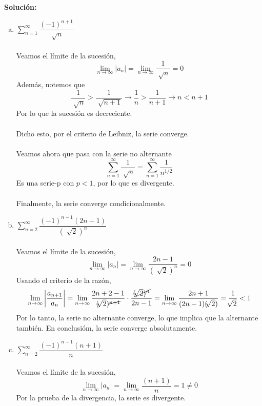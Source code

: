 \documentclass[12pt]{article}
\newenvironment{solucion}
{\begin{mdframed}[backgroundcolor=black!10]
		{\bf Solución:}\\
	}
	{
	\end{mdframed}
}
\newenvironment{preguntas}
{\begin{enumerate}\itemsep12pt
	}
	{
	\end{enumerate}
}
\newcommand{\ra}{\rightarrow}
\begin{document}
\begin{preguntas}
\begin{solucion}
\begin{enumerate}[a)]
\item $\sum\limits_{n=1}^{\infty}\dfrac{(-1)^{n+1}}{\sqrt[]{n}}$\\
			\\
			Veamos el límite de la sucesión,
			$$\lim_{n\ra\infty} |a_n| = \lim_{n\ra\infty} \dfrac{1}{\sqrt[]{n}} = 0$$
			Además, notemos que 
			$$\dfrac{1}{\sqrt[]{n}} > \dfrac{1}{\sqrt[]{n+1}} \ra \dfrac{1}{n} > \dfrac{1}{n+1} \ra n < n+1$$
			Por lo que la sucesión es decreciente.\\
			\\
			Dicho esto, por el criterio de Leibniz, la serie converge.\\
			\\
			Veamos ahora que pasa con la serie no alternante 
			$$\sum\limits_{n=1}^{\infty}\dfrac{1}{\sqrt[]{n}} = \sum\limits_{n=1}^{\infty}\dfrac{1}{n^{1/2}}$$
			Es una serie-p con $p<1$, por lo que es divergente.\\
			\\
			Finalmente, la serie converge condicionalmente.
\item $\sum\limits_{n=2}^{\infty}\dfrac{(-1)^{n-1}(2n-1)}{(\sqrt[]{2})^n}$\\
			\\
			Veamos el límite de la sucesión,
			$$\lim_{n\ra\infty} |a_n| = \lim_{n\ra\infty} \dfrac{2n-1}{(\sqrt[]{2})^n} = 0$$
			Usando el criterio de la razón,
			$$\lim\limits_{n \ra \infty} \left|\dfrac{a_{n+1}}{a_n}\right|
			= \lim\limits_{n \ra \infty} \dfrac{2n+2-1}{(\sqrt[]{2})^{\cancel{n+1}}} \cdot \dfrac{(\cancel{\sqrt[]{2})^n}}{2n-1}
			= \lim\limits_{n \ra \infty} \dfrac{2n+1}{(2n-1)(\sqrt[]{2})} = \dfrac{1}{\sqrt[]{2}} < 1$$
			Por lo tanto, la serie no alternante converge, lo que implica que la alternante también. En conclusióm, la serie converge absolutamente.
\item $\sum\limits_{n=2}^{\infty}\dfrac{(-1)^{n-1}(n+1)}{n}$\\
			\\
			Veamos el límite de la sucesión,
			$$\lim_{n\ra\infty} |a_n| = \lim_{n\ra\infty}\dfrac{(n+1)}{n} = 1 \neq 0$$
			Por la prueba de la divergencia, la serie es divergente.
\end{enumerate}
\end{solucion}
\end{preguntas}
\end{document}
